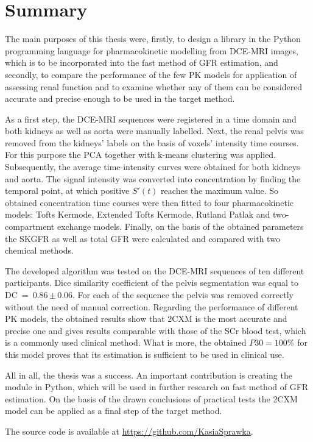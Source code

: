 \chapter{Summary}


The main purposes of this thesis were, firstly, to design a library in the Python programming language for pharmacokinetic modelling from DCE-MRI images, which is to be incorporated into the fast method of GFR estimation, and secondly, to compare the performance of the few PK models for application of assessing renal function and to examine whether any of them can be considered accurate and precise enough to be used in the target method.

As a first step, the DCE-MRI sequences were registered in a time domain and both kidneys as well as aorta were manually labelled. Next, the renal pelvis was removed from the kidneys' labels on the basis of voxels' intensity time courses. For this purpose the PCA together with k-means clustering was applied. Subsequently, the average time-intensity curves were obtained for both kidneys and aorta. The signal intensity was converted into concentration by finding the temporal point, at which positive $S'(t)$ reaches the maximum value. So obtained concentration time courses were then fitted to four pharmacokinetic models: Tofts Kermode, Extended Tofts Kermode, Rutland Patlak and two-compartment exchange models. Finally, on the basis of the obtained parameters the SKGFR as well as total GFR were calculated and compared with two chemical methods. 
  
The developed algorithm was tested on the DCE-MRI sequences of ten different participants. Dice similarity coefficient of the pelvis segmentation was equal to DC~=~0.86\,$\pm$\,0.06. For each of the sequence the pelvis was removed correctly without the need of manual correction. Regarding the performance of different PK models, the obtained results show that 2CXM is the most accurate and precise one and gives results comparable with those of the SCr blood test, which is a commonly used clinical method. What is more, the obtained $P30 = 100\%$ for this model proves that its estimation is sufficient to be used in clinical use.   

All in all, the thesis was a success. An important contribution is creating the module in Python, which will be used in further research on fast method of GFR estimation.  
On the basis of the drawn conclusions of practical tests the 2CXM model can be applied as a final step of the target method.

The source code is available at \underline{\url{https://github.com/KasiaSprawka}}.